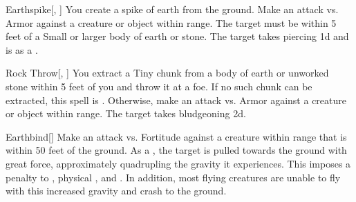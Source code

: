 \lowercase{\hypertarget{spell:Earthspike}{}}\label{spell:Earthspike}
\begin{apability}[\nth{1}]{\hypertarget{spell:Earthspike}{Earthspike}}[, ]
You create a spike of earth from the ground.
Make an attack vs. Armor against a creature or object within \rngmed range.
The target must be within 5 feet of a Small or larger body of earth or stone.
\hit The target takes piercing  \plus1d and is  as a .
\end{apability}
\vspace{0.25em}



\lowercase{\hypertarget{spell:Rock Throw}{}}\label{spell:Rock Throw}
\begin{apability}[\nth{1}]{\hypertarget{spell:Rock Throw}{Rock Throw}}[, ]
You extract a Tiny chunk from a body of earth or unworked stone within 5 feet of you and throw it at a foe.
If no such chunk can be extracted, this spell is .
Otherwise, make an attack vs. Armor against a creature or object within \rngmed range.
\hit The target takes bludgeoning  \plus2d.
\end{apability}
\vspace{0.25em}



\lowercase{\hypertarget{spell:Earthbind}{}}\label{spell:Earthbind}
\begin{apability}[\nth{2}]{\hypertarget{spell:Earthbind}{Earthbind}}[]
Make an attack vs. Fortitude against a creature within \rngmed range that is within 50 feet of the ground.
\hit As a , the target is pulled towards the ground with great force, approximately quadrupling the gravity it experiences.
This imposes a  penalty to , physical , and .
In addition, most flying creatures are unable to fly with this increased gravity and crash to the ground.
\end{apability}
\vspace{0.25em}



